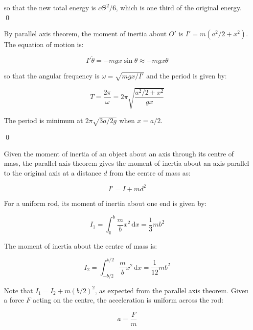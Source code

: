 \documentclass[12pt]{article}
\begin{document}
so that the new total energy is $c\Theta^{2}/6$, which is one third of the original energy.
\qed


By parallel axis theorem, the moment of inertia about $O'$ is $I' = m(a^{2}/2 + x^{2})$. The equation of motion is:

\begin{equation}
    I' \ddot{\theta} = -mgx \sin{\theta} \approx -mgx \theta
\end{equation}

so that the angular frequency is $\omega = \sqrt{mgx/I'}$ and the period is given by:

\begin{equation}
    T = \frac{2\pi}{\omega} = 2\pi \sqrt{\frac{a^{2}/2 + x^{2}}{gx}}
\end{equation}

\begin{center}
    
\end{center}

The period is minimum at $2\pi \sqrt{3a/2g}$ when $x = a/2$.

\qed


Given the moment of inertia of an object about an axis through its centre of mass, the parallel axis theorem gives the moment of inertia about an axis parallel to the original axis at a distance $d$ from the centre of mass as:

\begin{equation}
    I' = I + md^{2}
\end{equation}

For a uniform rod, its moment of inertia about one end is given by:

\begin{equation}
    I_{1} = \int_{0}^{b} \frac{m}{b} x^{2} \, \mathrm{d}x = \frac{1}{3} mb^{2}
\end{equation}

The moment of inertia about the centre of mass is:

\begin{equation}
    I_{2} = \int_{-b/2}^{b/2} \frac{m}{b} x^2 \, \mathrm{d}x = \frac{1}{12} mb^{2}
\end{equation}

Note that $I_{1} = I_{2} + m(b/2)^2$, as expected from the parallel axis theorem. Given a force $F$ acting on the centre, the acceleration is uniform across the rod:

\begin{equation}
    a = \frac{F}{m}
\end{equation}
\end{document}
